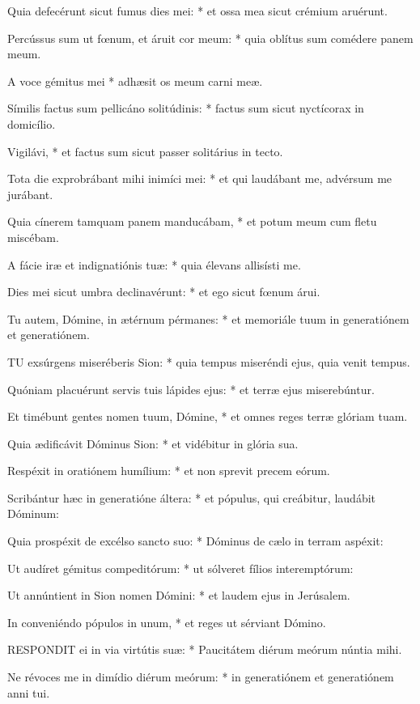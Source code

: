 Quia defecérunt sicut fumus dies mei: * et ossa mea sicut crémium aruérunt.

Percússus sum ut fœnum, et áruit cor meum: * quia oblítus sum comédere panem meum.

A voce gémitus mei * adhæsit os meum carni meæ.

Símilis factus sum pellicáno solitúdinis: * factus sum sicut nyctícorax in domicílio.

Vigilávi, * et factus sum sicut passer solitárius in tecto.

Tota die exprobrábant mihi inimíci mei: * et qui laudábant me, advérsum me jurábant.

Quia cínerem tamquam panem manducábam, * et potum meum cum fletu miscébam.

A fácie iræ et indignatiónis tuæ: * quia élevans allisísti me.

Dies mei sicut umbra declinavérunt: * et ego sicut fœnum árui.

Tu autem, Dómine, in ætérnum pérmanes: * et memoriále tuum in generatiónem et generatiónem.


\lettrine[lines=2]{T}{U} exsúrgens miseréberis Sion: * quia tempus miseréndi ejus, quia venit tempus.

Quóniam placuérunt servis tuis lápides ejus: * et terræ ejus miserebúntur.

Et timébunt gentes nomen tuum, Dómine, * et omnes reges terræ glóriam tuam.

Quia ædificávit Dóminus Sion: * et vidébitur in glória sua.

Respéxit in oratiónem humílium: * et non sprevit precem eórum.

Scribántur hæc in generatióne áltera: * et pópulus, qui creábitur, laudábit Dóminum:

Quia prospéxit de excélso sancto suo: * Dóminus de cælo in terram aspéxit:

Ut audíret gémitus compeditórum: * ut sólveret fílios interemptórum:

Ut annúntient in Sion nomen Dómini: * et laudem ejus in Jerúsalem.

In conveniéndo pópulos in unum, * et reges ut sérviant Dómino.


\lettrine[lines=2]{R}{ESPONDIT} ei in via virtútis suæ: * Paucitátem diérum meórum núntia mihi.

Ne révoces me in dimídio diérum meórum: * in generatiónem et generatiónem anni tui.

